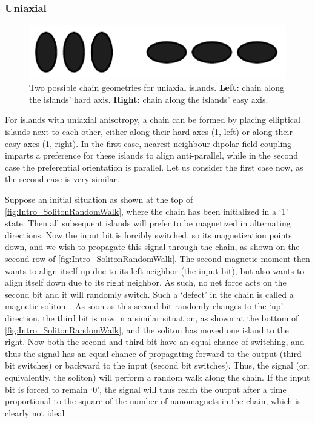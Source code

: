 \documentclass[11pt,a4paper,english,twoside]{article}
\begin{document}
\subsubsection{Uniaxial}
\begin{figure}[t!]
    \centering
    \includegraphics[width=0.6\columnwidth]{Figures/Introduction/Uniaxial_chains.pdf}
    \caption{Two possible chain geometries for uniaxial islands. \textbf{Left:} chain along the islands' hard axis. \textbf{Right:} chain along the islands' easy axis.}
    \label{fig:Intro_IslandEllipticChainGeometries}
\end{figure}
For islands with uniaxial anisotropy, a chain can be formed by placing elliptical islands next to each other, either along their hard axes (\cref{fig:Intro_IslandEllipticChainGeometries}, left) or along their easy axes (\cref{fig:Intro_IslandEllipticChainGeometries}, right). In the first case, nearest-neighbour dipolar field coupling imparts a preference for these islands to align anti-parallel, while in the second case the preferential orientation is parallel. Let us consider the first case now, as the second case is very similar. \par
Suppose an initial situation as shown at the top of \cref{fig:Intro_SolitonRandomWalk}, where the chain has been initialized in a `1' state. Then all subsequent islands will prefer to be magnetized in alternating directions. Now the input bit is forcibly switched, so its magnetization points down, and we wish to propagate this signal through the chain, as shown on the second row of \cref{fig:Intro_SolitonRandomWalk}. The second magnetic moment then wants to align itself up due to its left neighbor (the input bit), but also wants to align itself down due to its right neighbor. As such, no net force acts on the second bit and it will randomly switch. Such a `defect' in the chain is called a magnetic soliton~\cite{MQCA_RoomTemp}. As soon as this second bit randomly changes to the `up' direction, the third bit is now in a similar situation, as shown at the bottom of \cref{fig:Intro_SolitonRandomWalk}, and the soliton has moved one island to the right. Now both the second and third bit have an equal chance of switching, and thus the signal has an equal chance of propagating forward to the output (third bit switches) or backward to the input (second bit switches). Thus, the signal (or, equivalently, the soliton) will perform a random walk along the chain. If the input bit is forced to remain `0', the signal will thus reach the output after a time proportional to the square of the number of nanomagnets in the chain, which is clearly not ideal~\cite{Wolfram_RandomWalk}. \par
\end{document}
